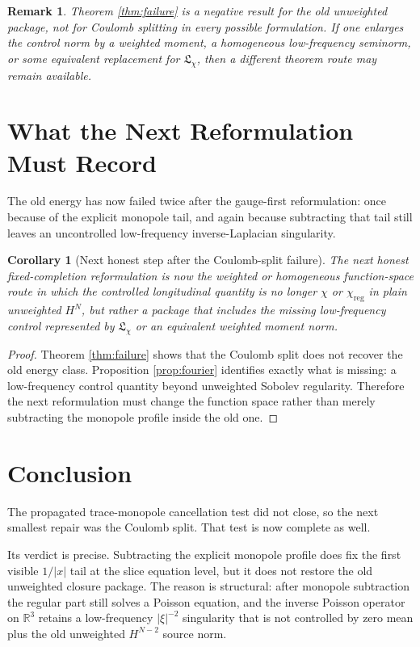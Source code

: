 \documentclass[11pt]{article}
\newtheorem{remark}{Remark}
\newtheorem{corollary}{Corollary}
\begin{document}
\begin{remark}
Theorem \ref{thm:failure} is a negative result for the \emph{old unweighted package}, not for Coulomb splitting in every possible formulation. If one enlarges the control norm by a weighted moment, a homogeneous low-frequency seminorm, or some equivalent replacement for \(\mathfrak L_\chi\), then a different theorem route may remain available.
\end{remark}

\section{What the Next Reformulation Must Record}

The old energy has now failed twice after the gauge-first reformulation: once because of the explicit monopole tail, and again because subtracting that tail still leaves an uncontrolled low-frequency inverse-Laplacian singularity.

\begin{corollary}[Next honest step after the Coulomb-split failure]
\label{cor:next}
The next honest fixed-completion reformulation is now the weighted or homogeneous function-space route in which the controlled longitudinal quantity is no longer \(\chi\) or \(\chi_{\mathrm{reg}}\) in plain unweighted \(H^N\), but rather a package that includes the missing low-frequency control represented by \(\mathfrak L_\chi\) or an equivalent weighted moment norm.
\end{corollary}

\begin{proof}
Theorem \ref{thm:failure} shows that the Coulomb split does not recover the old energy class. Proposition \ref{prop:fourier} identifies exactly what is missing: a low-frequency control quantity beyond unweighted Sobolev regularity. Therefore the next reformulation must change the function space rather than merely subtracting the monopole profile inside the old one.
\end{proof}

\section{Conclusion}

The propagated trace-monopole cancellation test did not close, so the next smallest repair was the Coulomb split. That test is now complete as well.

Its verdict is precise. Subtracting the explicit monopole profile does fix the first visible \(1/|x|\) tail at the slice equation level, but it does not restore the old unweighted closure package. The reason is structural: after monopole subtraction the regular part still solves a Poisson equation, and the inverse Poisson operator on \(\mathbb R^3\) retains a low-frequency \(|\xi|^{-2}\) singularity that is not controlled by zero mean plus the old unweighted \(H^{N-2}\) source norm.
\end{document}
